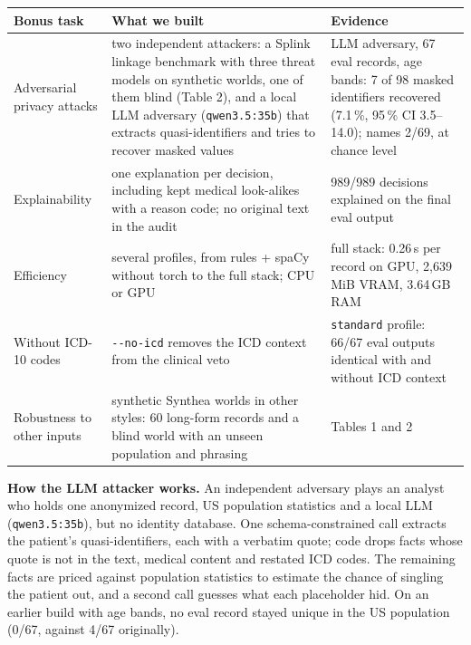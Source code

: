 \documentclass[10pt,a4paper]{article}
\makeatletter
\renewcommand\section{\@startsection{section}{1}{\z@}{-1.5ex plus -.3ex minus -.2ex}{0.5ex}{\normalfont\large\bfseries\color{accent}}}
\newcommand{\code}[1]{\texttt{\small #1}}
\makeatother
\begin{document}
\section{Bonus tasks}
{\footnotesize
\begin{tabularx}{\textwidth}{@{}P{2.6cm}LL@{}}
\toprule
Bonus task & What we built & Evidence\\
\midrule
Adversarial privacy attacks & two independent attackers: a Splink linkage benchmark with three threat models on synthetic worlds, one of them blind (Table 2), and a local LLM adversary (\code{qwen3.5:35b}) that extracts quasi-identifiers and tries to recover masked values & LLM adversary, 67 eval records, age bands: 7 of 98 masked identifiers recovered (7.1\,\%, 95\,\% CI 3.5--14.0); names 2/69, at chance level\\
Explainability & one explanation per decision, including kept medical look-alikes with a reason code; no original text in the audit & 989/989 decisions explained on the final eval output\\
Efficiency & several profiles, from rules + spaCy without torch to the full stack; CPU or GPU & full stack: 0.26\,s per record on GPU, 2,639\,MiB VRAM, 3.64\,GB RAM\\
Without ICD-10 codes & \code{-{}-no-icd} removes the ICD context from the clinical veto & \code{standard} profile: 66/67 eval outputs identical with and without ICD context\\
Robustness to other inputs & synthetic Synthea worlds in other styles: 60 long-form records and a blind world with an unseen population and phrasing & Tables 1 and 2\\
\bottomrule
\end{tabularx}}

\textbf{How the LLM attacker works.} An independent adversary plays an analyst who holds one anonymized
record, US population statistics and a local LLM (\code{qwen3.5:35b}), but no identity database. One schema-constrained call
extracts the patient's quasi-identifiers, each with a verbatim quote; code drops facts whose quote is not in the text,
medical content and restated ICD codes. The remaining facts are priced against population statistics to estimate the
chance of singling the patient out, and a second call guesses what each placeholder hid. On an earlier build with age
bands, no eval record stayed unique in the US population (0/67, against 4/67 originally).
\end{document}
